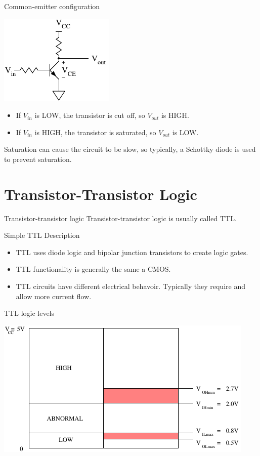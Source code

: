 \begin{frame}{Common-emitter configuration}
  \begin{center}
    \includegraphics{CommonEmitter}
  \end{center}
  \begin{itemize}
    \item If $V_{in}$ is LOW, the transistor is cut off, so $V_{out}$ is HIGH.
    \item If $V_{in}$ is HIGH, the transistor is saturated, so $V_{out}$ is LOW.
  \end{itemize}
  Saturation can cause the circuit to be slow, so typically, a Schottky diode is used to prevent saturation.
\end{frame}

\section{Transistor-Transistor Logic}

\begin{frame}{Transistor-transistor logic}
  Transistor-transistor logic is usually called TTL.
  \begin{block}{Simple TTL Description}
    \begin{itemize}
      \item TTL uses diode logic and bipolar junction transistors to create logic gates.
      \item TTL functionality is generally the same a CMOS.
      \item TTL circuits have different electrical behavoir.  Typically they require and allow more current flow.
    \end{itemize}
  \end{block}
\end{frame}

\begin{frame}{TTL logic levels}
  \begin{center}
    \includegraphics{TTLLogicLevels}
  \end{center}
\end{frame}

